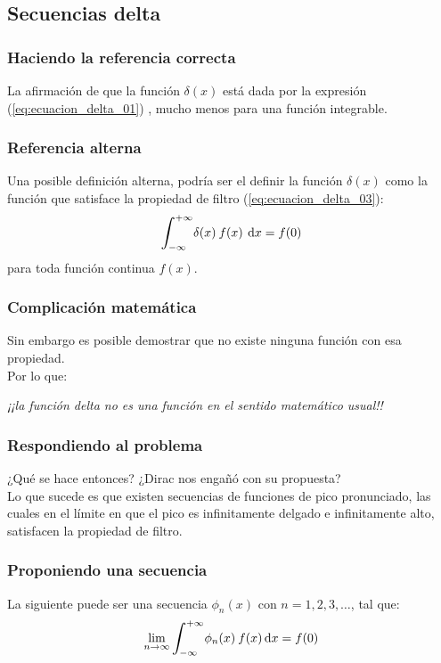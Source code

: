 \documentclass[12pt]{beamer}
\begin{document}
\subsection{Secuencias delta}\label{secuencias_delta}

\begin{frame}
\frametitle{Haciendo la referencia correcta}
La afirmación de que la función $\delta (x)$ está dada por la expresión (\ref{eq:ecuacion_delta_01}) \textit{}, mucho menos para una función integrable.
\end{frame}

\begin{frame}
\frametitle{Referencia alterna}
Una posible definición alterna, podría ser el definir la función $\delta (x)$ como la función que satisface la propiedad de filtro (\ref{eq:ecuacion_delta_03}):
\pause
\begin{align*}
\scaleint{6ex}_{\bs -\infty}^{+ \infty} \delta (x) \: f (x) \: \dd{x} = f (0)
\end{align*}
para toda función continua $f (x)$. 
\end{frame}

\begin{frame}
\frametitle{Complicación matemática}
Sin embargo es posible demostrar que no existe ninguna función con esa propiedad.
\\
\bigskip
\pause
Por lo que:
\pause
\begin{center}
\textit{¡¡la función delta no es una función en el sentido matemático usual!!}
\end{center}
\end{frame}

\begin{frame}
\frametitle{Respondiendo al problema}
¿Qué se hace entonces? \pause ¿Dirac nos engañó con su propuesta?
\\
\bigskip
\pause
Lo que sucede es que existen secuencias de funciones de pico pronunciado, las cuales en el límite en que el pico es infinitamente delgado e infinitamente alto, satisfacen la propiedad de filtro.
\end{frame}

\begin{frame}
\frametitle{Proponiendo una secuencia}
La siguiente puede ser una secuencia $\phi_{n} (x)$ con $n = 1, 2, 3, \ldots$, tal que:
\pause
\begin{align*}
\lim_{n \to \infty} \scaleint{6ex}_{\bs -\infty}^{+ \infty} \phi_{n} (x) \: f (x) \dd{x} =  f (0)
\end{align*}
\end{frame}
\end{document}
